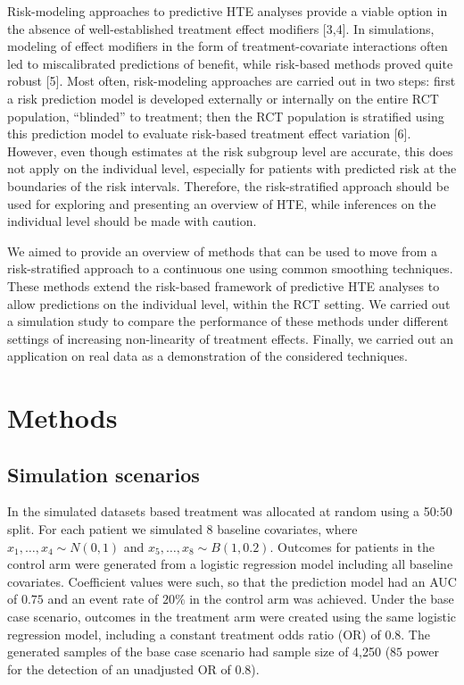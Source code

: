 \documentclass{article}
\begin{document}
Risk-modeling approaches to predictive HTE analyses provide a viable
option in the absence of well-established treatment effect modifiers
{[}3,4{]}. In simulations, modeling of effect modifiers in the form of
treatment-covariate interactions often led to miscalibrated predictions
of benefit, while risk-based methods proved quite robust {[}5{]}. Most
often, risk-modeling approaches are carried out in two steps: first a
risk prediction model is developed externally or internally on the
entire RCT population, ``blinded'' to treatment; then the RCT population
is stratified using this prediction model to evaluate risk-based
treatment effect variation {[}6{]}. However, even though estimates at
the risk subgroup level are accurate, this does not apply on the
individual level, especially for patients with predicted risk at the
boundaries of the risk intervals. Therefore, the risk-stratified
approach should be used for exploring and presenting an overview of HTE,
while inferences on the individual level should be made with caution.

We aimed to provide an overview of methods that can be used to move from
a risk-stratified approach to a continuous one using common smoothing
techniques. These methods extend the risk-based framework of predictive
HTE analyses to allow predictions on the individual level, within the
RCT setting. We carried out a simulation study to compare the
performance of these methods under different settings of increasing
non-linearity of treatment effects. Finally, we carried out an
application on real data as a demonstration of the considered
techniques.

\hypertarget{methods}{%
\section{Methods}\label{methods}}

\hypertarget{simulation-scenarios}{%
\subsection{Simulation scenarios}\label{simulation-scenarios}}

In the simulated datasets based treatment was allocated at random using
a 50:50 split. For each patient we simulated \(8\) baseline covariates,
where \(x_1,\dots,x_4\sim N(0, 1)\) and \(x_5,\dots,x_8\sim B(1, 0.2)\).
Outcomes for patients in the control arm were generated from a logistic
regression model including all baseline covariates. Coefficient values
were such, so that the prediction model had an AUC of \(0.75\) and an
event rate of \(20\%\) in the control arm was achieved. Under the base
case scenario, outcomes in the treatment arm were created using the same
logistic regression model, including a constant treatment odds ratio
(OR) of \(0.8\). The generated samples of the base case scenario had
sample size of 4,250 (\(85%
\) power for the detection of an unadjusted OR of \(0.8\)).
\end{document}
